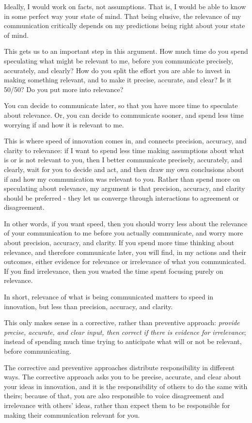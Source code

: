 Ideally, I would work on facts, not assumptions. That is, I would be able to know in some perfect way your state of mind. That being elusive, the relevance of my communication critically depends on my predictions being right about your state of mind. 

This gets us to an important step in this argument. How much time do you spend speculating what might be relevant to me, before you communicate precisely, accurately, and clearly? How do you split the effort you are able to invest in making something relevant, and to make it precise, accurate, and clear? Is it 50/50? Do you put more into relevance? 

You can decide to communicate later, so that you have more time to speculate about relevance. Or, you can decide to communicate sooner, and spend less time worrying if and how it is relevant to me. 

This is where speed of innovation comes in, and connects precision, accuracy, and clarity to relevance: if I want to spend less time making assumptions about what is or is not relevant to you, then I better communicate precisely, accurately, and clearly, wait for you to decide and act, and then draw my own conclusions about if and how my communication was relevant to you. Rather than spend more on speculating about relevance, my argument is that precision, accuracy, and clarity should be preferred - they let us converge through interactions to agreement or disagreement.

In other words, if you want speed, then you should worry less about the relevance of your communication to me before you actually communicate, and worry more about precision, accuracy, and clarity. If you spend more time thinking about relevance, and therefore communicate later, you will find, in my actions and their outcomes, either evidence for relevance or irrelevance of what you communicated. If you find irrelevance, then you wasted the time spent focusing purely on relevance.

In short, relevance of what is being communicated matters to speed in innovation, but less than precision, accuracy, and clarity. 

This only makes sense in a corrective, rather than preventive approach: \textit{provide precise, accurate, and clear input, then correct if there is evidence for irrelevance}; instead of spending much time trying to anticipate what will or not be relevant, before communicating.

The corrective and preventive approaches distribute responsibility in different ways. The corrective approach asks you to be precise, accurate, and clear about your ideas in innovation, and it is the responsibility of others to do the same with theirs; because of that, you are also responsible to voice disagreement and irrelevance with others' ideas, rather than expect them to be responsible for making their communication relevant for you.

